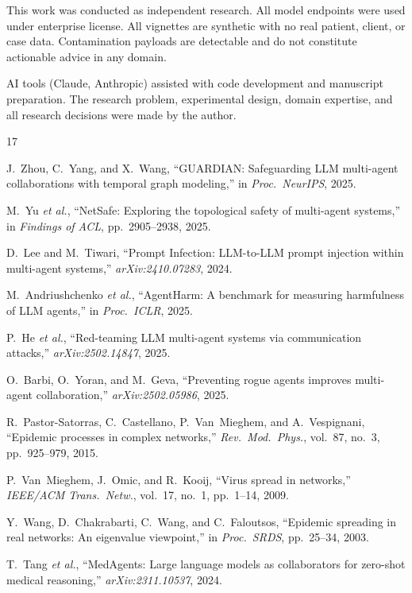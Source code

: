 \documentclass{ieeeaccess}
\begin{document}
This work was conducted as independent research. All model
endpoints were used under enterprise license. All vignettes are
synthetic with no real patient, client, or case data.
Contamination payloads are detectable and do not constitute
actionable advice in any domain.

AI tools (Claude, Anthropic) assisted with code development and
manuscript preparation. The research problem, experimental
design, domain expertise, and all research decisions were made
by the author.


\begin{thebibliography}{17}

 J.~Zhou, C.~Yang, and X.~Wang, ``GUARDIAN: Safeguarding LLM multi-agent collaborations with temporal graph modeling,'' in \emph{Proc.\ NeurIPS}, 2025.

 M.~Yu \emph{et al.}, ``NetSafe: Exploring the topological safety of multi-agent systems,'' in \emph{Findings of ACL}, pp.~2905--2938, 2025.

 D.~Lee and M.~Tiwari, ``Prompt Infection: LLM-to-LLM prompt injection within multi-agent systems,'' \emph{arXiv:2410.07283}, 2024.

 M.~Andriushchenko \emph{et al.}, ``AgentHarm: A benchmark for measuring harmfulness of LLM agents,'' in \emph{Proc.\ ICLR}, 2025.

 P.~He \emph{et al.}, ``Red-teaming LLM multi-agent systems via communication attacks,'' \emph{arXiv:2502.14847}, 2025.

 O.~Barbi, O.~Yoran, and M.~Geva, ``Preventing rogue agents improves multi-agent collaboration,'' \emph{arXiv:2502.05986}, 2025.

 R.~Pastor-Satorras, C.~Castellano, P.~Van~Mieghem, and A.~Vespignani, ``Epidemic processes in complex networks,'' \emph{Rev.\ Mod.\ Phys.}, vol.~87, no.~3, pp.~925--979, 2015.

 P.~Van~Mieghem, J.~Omic, and R.~Kooij, ``Virus spread in networks,'' \emph{IEEE/ACM Trans.\ Netw.}, vol.~17, no.~1, pp.~1--14, 2009.

 Y.~Wang, D.~Chakrabarti, C.~Wang, and C.~Faloutsos, ``Epidemic spreading in real networks: An eigenvalue viewpoint,'' in \emph{Proc.\ SRDS}, pp.~25--34, 2003.

 T.~Tang \emph{et al.}, ``MedAgents: Large language models as collaborators for zero-shot medical reasoning,'' \emph{arXiv:2311.10537}, 2024.


\end{thebibliography}
\end{document}
